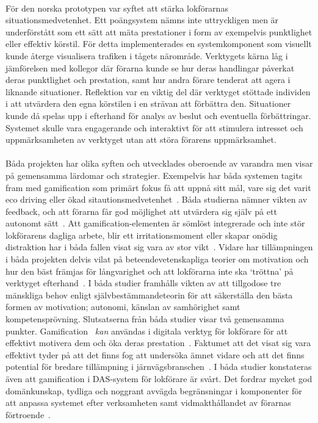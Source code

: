 \paragraph{}
\hspace{-11pt}För den norska prototypen var syftet att stärka lokförarnas situationsmedvetenhet.
Ett poängsystem nämns inte uttryckligen men är underförstått som ett sätt att mäta prestationer i form av exempelvis punktlighet eller effektiv körstil.
För detta implementerades en systemkomponent som visuellt kunde återge visualisera trafiken i tågets närområde.
Verktygets kärna låg i jämförelsen med kollegor där förarna kunde se hur deras handlingar påverkat deras punktlighet och prestation, samt hur andra förare tenderat att agera i liknande situationer.
Reflektion var en viktig del där verktyget stöttade individen i att utvärdera den egna körstilen i en strävan att förbättra den.
Situationer kunde då spelas upp i efterhand för analys av beslut och eventuella förbättringar.
Systemet skulle vara engagerande och interaktivt för att stimulera intresset och uppmärksamheten av verktyget utan att störa förarens uppmärksamhet.
\paragraph{}
\hspace{-11pt}Båda projekten har olika syften och utvecklades oberoende av varandra men visar på gemensamma lärdomar och strategier.
Exempelvis har båda systemen tagits fram med gamification som primärt fokus få att uppnå sitt mål, vare sig det varit eco driving eller ökad sitautionsmedvetenhet~\cite{Bae2014, Cwil2018}.
Båda studierna nämner vikten av feedback, och att förarna får god möjlighet att utvärdera sig själv på ett autonomt sätt~\cite{Bae2014, Cwil2018}.
Att gamification-elementen är sömlöst integrerade och inte stör lokförarens dagliga arbete, blir ett irritationsmoment eller skapar onödig distraktion har i båda fallen visat sig vara av stor vikt~\cite{Bae2014, Cwil2018}.
Vidare har tillämpningen i båda projekten delvis vilat på beteendevetenskapliga teorier om motivation och hur den bäst främjas för långvarighet och att lokförarna inte ska \lq{}tröttna\rq{} på verktyget efterhand~\cite{Bae2014, Cwil2018}.
I båda studier framhålls vikten av att tillgodose tre mänskliga behov enligt självbestämmandeteorin för att säkerställa den bästa formen av motivation; autonomi, känslan av samhörighet samt kompetensprövning.
Slutsatserna från båda studier visar två gemensamma punkter.
Gamification ~\emph{kan} användas i digitala verktyg för lokförare för att effektivt motivera dem och öka deras prestation~\cite{Bae2014, Cwil2018}.
Faktumet att det visat sig vara effektivt tyder på att det finns fog att undersöka ämnet vidare och att det finns potential för bredare tillämpning i järnvägsbranschen~\cite{Bae2014, Cwil2018}.
I båda studier konstateras även att gamification i DAS-system för lokförare är svårt.
Det fordrar mycket god domänkunskap, tydliga och noggrant avvägda begränsningar i komponenter för att anpassa systemet efter verksamheten samt vidmakthållandet av förarnas förtroende~\cite{Bae2014, Cwil2018}.
